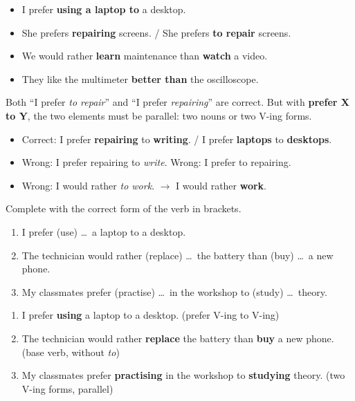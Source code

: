 \documentclass[11pt]{article}
\begin{document}
\begin{exemplebox}
\begin{itemize}
\item I prefer \textbf{using a laptop to} a desktop.
\item She prefers \textbf{repairing} screens. / She prefers \textbf{to repair} screens.
\item We would rather \textbf{learn} maintenance than \textbf{watch} a video.
\item They like the multimeter \textbf{better than} the oscilloscope.
\end{itemize}
\end{exemplebox}

\begin{attention}
Both ``I prefer \emph{to repair}'' and ``I prefer \emph{repairing}'' are correct. But with \textbf{prefer X to Y}, the two elements must be parallel: two nouns or two V-ing forms.
\begin{itemize}
\item Correct: I prefer \textbf{repairing} to \textbf{writing}. / I prefer \textbf{laptops} to \textbf{desktops}.
\item Wrong: I prefer repairing to \emph{write}. \quad Wrong: I prefer to repairing.
\item Wrong: I would rather \emph{to work}. $\rightarrow$ I would rather \textbf{work}.
\end{itemize}
\end{attention}

\begin{exoresolu}
Complete with the correct form of the verb in brackets.
\begin{enumerate}
\item I prefer (use) \dots\ a laptop to a desktop.
\item The technician would rather (replace) \dots\ the battery than (buy) \dots\ a new phone.
\item My classmates prefer (practise) \dots\ in the workshop to (study) \dots\ theory.
\end{enumerate}
\tcblower
\begin{enumerate}
\item I prefer \textbf{using} a laptop to a desktop. (prefer V-ing to V-ing)
\item The technician would rather \textbf{replace} the battery than \textbf{buy} a new phone. (base verb, without \emph{to})
\item My classmates prefer \textbf{practising} in the workshop to \textbf{studying} theory. (two V-ing forms, parallel)
\end{enumerate}
\end{exoresolu}
\end{document}
